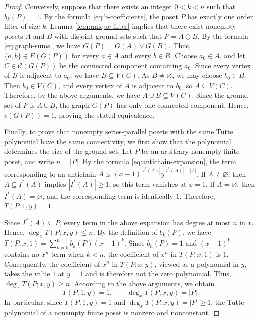 \documentclass[11pt,a4paper]{article}
\begin{document}
\begin{proof}
Conversely, suppose that there exists an integer $0<k<n$ such that $b_k(P)=1$.
By the formula \eqref{eq:b-coefficients}, the poset $P$ has exactly one order filter of size $k$.
Lemma \ref{lem:unique-filter} implies that there exist nonempty posets $A$ 
and $B$ with disjoint ground sets such that $P=A\oplus B$.
By the formula \eqref{eq:graph-sums}, we have $G(P)=G(A)\vee G(B)$.
Thus, $\{a,b\}\in E(G(P))$ for every $a\in A$ and every $b\in B$.
Choose $a_0\in A$, and let $C\in\mathcal C(G(P))$ be the connected component containing $a_0$.
Since every vertex of $B$ is adjacent to $a_0$, we have $B\subseteq V(C)$.
As $B\neq\varnothing$, we may choose $b_0\in B$.
Then $b_0\in V(C)$, and every vertex of $A$ is adjacent to $b_0$, so $A\subseteq V(C)$.
Therefore, by the above arguments, we have $A\cup B\subseteq V(C)$.
Since the ground set of $P$ is $A\cup B$, the graph $G(P)$ has only one connected component.
Hence, $c(G(P))=1$, proving the stated equivalence.

Finally, to prove that nonempty series-parallel posets
with the same Tutte polynomial have the same connectivity,
we first show that the polynomial determines the size of the ground set.
Let $P$ be an arbitrary nonempty finite poset, and write $n=|P|$.
By the formula \eqref{eq:antichain-expansion}, the term corresponding to an antichain $A$ is
$(x-1)^{|I^*(A)|}y^{|I^*(A)|-|A|}$.
If $A\neq\varnothing$, then $A\subseteq I^*(A)$ implies
$|I^*(A)|\geq 1$, so this term vanishes at $x=1$.
If $A=\varnothing$, then $I^*(A)=\varnothing$,
and the corresponding term is identically $1$.
Therefore, $T(P;1,y)=1$.

Since $I^*(A)\subseteq P$, every term in the above expansion has degree at most $n$ in $x$.
Hence, $\deg_x T(P;x,y)\leq n$.
By the definition of $b_k(P)$, we have $T(P;x,1)=\sum_{k=0}^{n}b_k(P)(x-1)^k$.
Since $b_n(P)=1$ and $(x-1)^k$ contains no $x^n$ term when $k<n$, 
the coefficient of $x^n$ in $T(P;x,1)$ is $1$.
Consequently, the coefficient of $x^n$ in $T(P;x,y)$,
viewed as a polynomial in $y$, takes the value $1$ at $y=1$ and is therefore not the zero polynomial.
Thus, $\deg_x T(P;x,y)\geq n$.
According to the above arguments, we obtain
\begin{equation}\label{eq:normalization-degree}
T(P;1,y)=1,\qquad \deg_x T(P;x,y)=|P|.
\end{equation}
In particular, since $T(P;1,y)=1$ and $\deg_x T(P;x,y)=|P|\geq 1$,
the Tutte polynomial of a nonempty finite poset is nonzero and nonconstant.


\end{proof}
\end{document}
